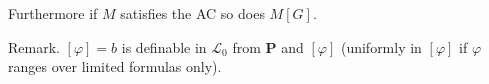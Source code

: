 Furthermore if $M$ satisfies the AC so does $M[G]$.

Remark. $[\varphi] = b$ is definable in $\mathcal{L}_0$ from $\mathbf{P}$ and $[\varphi]$ (uniformly in $[\varphi]$ if $\varphi$ ranges over limited formulas only).
